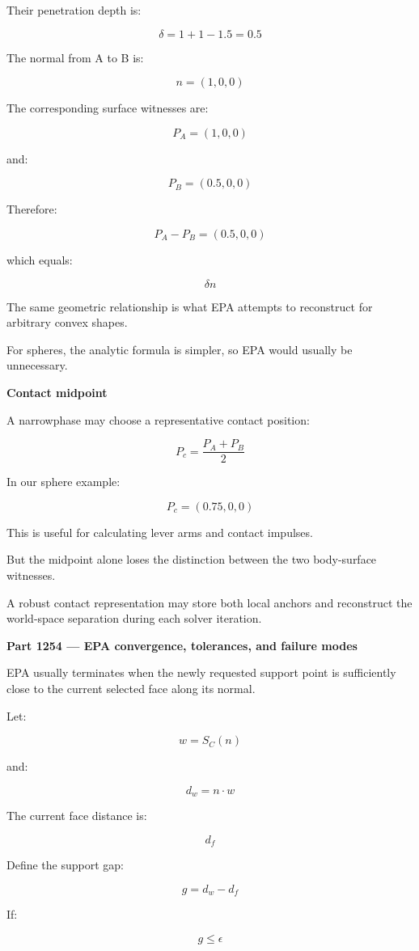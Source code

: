 Their penetration depth is:

\[
\delta=1+1-1.5=0.5
\]

The normal from A to B is:

\[
n=(1,0,0)
\]

The corresponding surface witnesses are:

\[
P_A=(1,0,0)
\]

and:

\[
P_B=(0.5,0,0)
\]

Therefore:

\[
P_A-P_B=(0.5,0,0)
\]

which equals:

\[
\delta n
\]

The same geometric relationship is what EPA attempts to reconstruct for arbitrary convex shapes.

For spheres, the analytic formula is simpler, so EPA would usually be unnecessary.

\textbf{Contact midpoint}

A narrowphase may choose a representative contact position:

\[
\boxed{ P_c=\frac{P_A+P_B}{2} }
\]

In our sphere example:

\[
P_c=(0.75,0,0)
\]

This is useful for calculating lever arms and contact impulses.

But the midpoint alone loses the distinction between the two body-surface witnesses.

A robust contact representation may store both local anchors and reconstruct the world-space separation during each solver iteration.

\textbf{Part 1254 --- EPA convergence, tolerances, and failure modes}

EPA usually terminates when the newly requested support point is sufficiently close to the current selected face along its normal.

Let:

\[
w=S_C(n)
\]

and:

\[
d_w=n\cdot w
\]

The current face distance is:

\[
d_f
\]

Define the support gap:

\[
\boxed{ g=d_w-d_f }
\]

If:

\[
g\le\epsilon
\]

